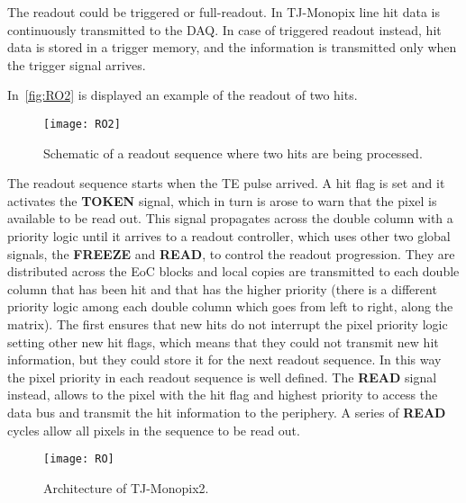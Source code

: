 The readout could be triggered or full-readout. In TJ-Monopix line hit data is continuously transmitted to the DAQ. In case of triggered readout instead, hit data is stored in a trigger memory, and the information is transmitted only when the trigger signal arrives.

In~\autoref{fig:RO2} is displayed an example of the readout of two hits. 

\begin{figure}[h!]
\centering
\texttt{[image: RO2]}
\caption{Schematic of a readout sequence where two hits are being processed.}
\label{fig:RO2}
\end{figure}

The readout sequence starts when the TE pulse arrived. A hit flag is set and it activates the \textsc{\textbf{TOKEN}} signal, which in turn is arose to warn that the pixel is available to be read out. This signal propagates across the double column with a priority logic until it arrives to a readout controller, which uses other two global signals, the \textsc{\textbf{FREEZE}} and \textsc{\textbf{READ}}, to control the readout progression. They are distributed across the EoC blocks and local copies are transmitted to each double column that has been hit and that has the higher priority (there is a different priority logic among each double column which goes from left to right, along the matrix).
The first ensures that new hits do not interrupt the pixel priority logic setting other new hit flags, which means that they could not transmit new hit information, but they could store it for the next readout sequence. In this way the pixel priority in each readout sequence is well defined. The \textsc{\textbf{READ}} signal instead, allows to the pixel with the hit flag and highest priority to access the data bus and transmit the hit information to the periphery. A series of \textsc{\textbf{READ}} cycles allow all pixels in the sequence to be read out.


\begin{figure}[h!]
\centering
\texttt{[image: RO]}
\caption{Architecture of TJ-Monopix2.}
\label{fig:RO}
\end{figure}



